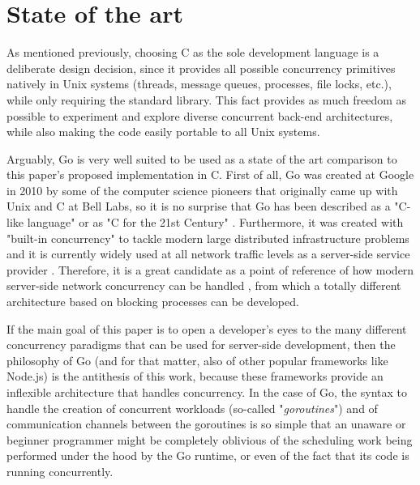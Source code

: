 \section{State of the art}
As mentioned previously, choosing C as the sole development language is a deliberate design decision, since it provides all possible concurrency primitives natively in Unix systems (threads, message queues, processes, file locks, etc.), while only requiring the standard library. This fact provides as much freedom as possible to experiment and explore diverse concurrent back-end architectures, while also making the code easily portable to all Unix systems.

Arguably, Go is very well suited to be used as a state of the art comparison to this paper's proposed implementation in C. First of all, Go was created at Google in 2010 by some of the computer science pioneers that originally came up with Unix and C at Bell Labs, so it is no surprise that Go has been described as a "C-like language" or as "C for the 21st Century" \cite{GoPL2015}. Furthermore, it was created with "built-in concurrency" to tackle modern large distributed infrastructure problems and it is currently widely used at all network traffic levels as a server-side service provider \cite{Pike2012}\cite{Ajmani2016}. Therefore, it is a great candidate as a point of reference of how modern server-side network concurrency can be handled \cite{GoArticleACM}, from which a totally different architecture based on blocking processes can be developed. 

If the main goal of this paper is to open a developer's eyes to the many different concurrency paradigms that can be used for server-side development, then the philosophy of Go (and for that matter, also of other popular frameworks like Node.js) is the antithesis of this work, because these frameworks provide an inflexible architecture that handles concurrency. In the case of Go, the syntax to handle the creation of concurrent workloads (so-called "\textit{goroutines}") and of communication channels between the goroutines is so simple that an unaware or beginner programmer might be completely oblivious of the scheduling work being performed under the hood by the Go runtime, or even of the fact that its code is running concurrently. 

